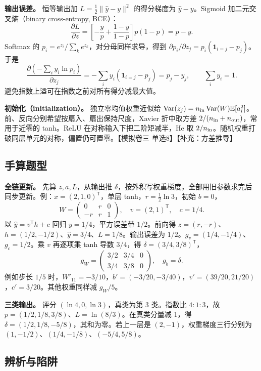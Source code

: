 \documentclass[UTF8,a4paper,zihao=-4,fontset=fandol]{ctexart}
\begin{document}
\textbf{输出误差。} 恒等输出加 $L=\tfrac12\|\hat y-y\|^2$ 的得分梯度为 $\hat y-y$。Sigmoid 加二元交叉熵（binary cross-entropy, BCE）：
\[
 \frac{\partial L}{\partial z}
 =\left[-\frac y p+\frac{1-y}{1-p}\right]p(1-p)=p-y.
\]
Softmax 的 $p_i=e^{z_i}/\sum_k e^{z_k}$，对分母同样求导，得到 $\partial p_i/\partial z_j=p_i(\mathbf1_{i=j}-p_j)$。于是
\[
 \frac{\partial(-\sum_i y_i\ln p_i)}{\partial z_j}
 =-\sum_i y_i(\mathbf1_{i=j}-p_j)=p_j-y_j,
 \qquad \sum_i y_i=1 .
\]
避免指数上溢可在指数之前对所有得分减最大值。

\textbf{初始化（initialization）。} 独立零均值权重近似给 $\operatorname{Var}(z_j)=n_{\rm in}\operatorname{Var}(W)\mathbb E[a_i^2]$。前、反向分别希望按扇入、扇出保持尺度，Xavier 折中取方差 $2/(n_{\rm in}+n_{\rm out})$，常用于近零的 tanh。ReLU 在对称输入下把二阶矩减半，He 取 $2/n_{\rm in}$。随机权重打破同层单元的对称，偏置仍可置零。【模拟卷三 单选8】【补充：方差推导】

\subsection{手算题型}

\textbf{全链更新。} 先算 $z,a,L$，从输出推 $\delta$，按外积写权重梯度，全部用旧参数求完后同步更新。例：$x=(2,1,0)^{\mathsf T}$，单层 tanh，$r=\tfrac12\ln3$，初始 $b=0$，
\[
 W=\begin{pmatrix}0&r&0\\-r&r&1\end{pmatrix},
 \quad v=(2,1)^{\mathsf T},\quad c=1/4.
\]
以 $\hat y=v^{\mathsf T}h+c$ 回归 $y=1/4$，平方误差带 $1/2$。前向得 $z=(r,-r)$、$h=(1/2,-1/2)$、$\hat y=3/4$、$L=1/8$。输出误差为 $1/2$。$g_v=(1/4,-1/4)$、$g_c=1/2$。乘 $v$ 再逐项乘 tanh 导数 $3/4$，得 $\delta=(3/4,3/8)^{\mathsf T}$，
\[
 g_W=\begin{pmatrix}3/2&3/4&0\\3/4&3/8&0\end{pmatrix},
 \quad g_b=\delta .
\]
例如步长 $1/5$ 时，$W'_{11}=-3/10$，$b'=(-3/20,-3/40)$，$v'=(39/20,21/20)$，$c'=3/20$。其他权重同样减 $g_W/5$。

\textbf{三类输出。} 评分 $(\ln4,0,\ln3)$，真类为第 3 类。指数比 $4:1:3$，故 $p=(1/2,1/8,3/8)$、$L=\ln(8/3)$。在真类分量减 1，得 $\delta=(1/2,1/8,-5/8)$，其和为零。若上一层是 $(2,-1)$，权重梯度三行分别为 $(1,-1/2)$、$(1/4,-1/8)$、$(-5/4,5/8)$。

\subsection{辨析与陷阱}
\end{document}
